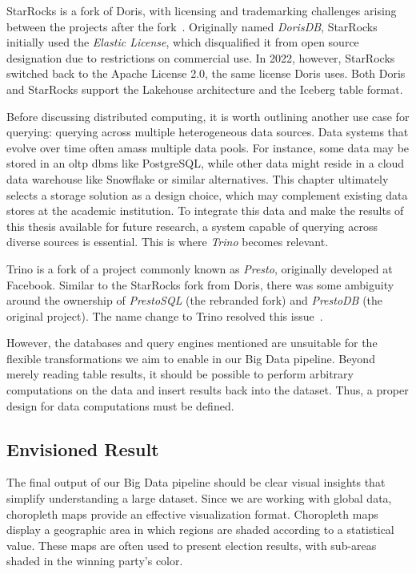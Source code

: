 StarRocks is a fork of Doris, with licensing and trademarking challenges arising between the projects after the fork~\cite{Chen2024}.
Originally named \textit{DorisDB}, StarRocks initially used the \textit{Elastic License}, which disqualified it from open source designation due to restrictions on commercial use.
In 2022, however, StarRocks switched back to the Apache License 2.0, the same license Doris uses.
Both Doris and StarRocks support the Lakehouse architecture and the Iceberg table format.

Before discussing distributed computing, it is worth outlining another use case for querying: querying across multiple heterogeneous data sources.
Data systems that evolve over time often amass multiple data pools.
For instance, some data may be stored in an \ac{oltp} \ac{dbms} like PostgreSQL, while other data might reside in a cloud data warehouse like Snowflake or similar alternatives.
This chapter ultimately selects a storage solution as a design choice, which may complement existing data stores at the academic institution.
To integrate this data and make the results of this thesis available for future research, a system capable of querying across diverse sources is essential.
This is where \textit{Trino} becomes relevant.

Trino is a fork of a project commonly known as \textit{Presto}, originally developed at Facebook.
Similar to the StarRocks fork from Doris, there was some ambiguity around the ownership of \textit{PrestoSQL} (the rebranded fork) and \textit{PrestoDB} (the original project).
The name change to Trino resolved this issue~\cite{Traverso2022}.

However, the databases and query engines mentioned are unsuitable for the flexible transformations we aim to enable in our Big Data pipeline.
Beyond merely reading table results, it should be possible to perform arbitrary computations on the data and insert results back into the dataset.
Thus, a proper design for data computations must be defined.

\subsection{Envisioned Result}
\label{sec:design-envisioned-result}

The final output of our Big Data pipeline should be clear visual insights that simplify understanding a large dataset.
Since we are working with global data, choropleth maps provide an effective visualization format.
Choropleth maps display a geographic area in which regions are shaded according to a statistical value.
These maps are often used to present election results, with sub-areas shaded in the winning party's color.

